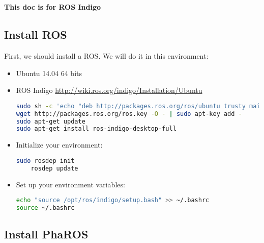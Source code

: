 \documentclass[a4paper,10pt,twoside]{book}
\begin{document}
\fi
\sloppy
\chapter{\installationTool{}}
\label{appendix:pharos}

\textbf{This doc is for ROS Indigo}

\section{Install ROS}

First, we should install a ROS. 
We will do it in this environment:

\begin{itemize}
	\item Ubuntu 14.04 64 bits
	\item ROS Indigo \url{http://wiki.ros.org/indigo/Installation/Ubuntu}

\begin{lstlisting}[language=bash]
sudo sh -c 'echo "deb http://packages.ros.org/ros/ubuntu trusty main" > /etc/apt/sources.list.d/ros-latest.list'
wget http://packages.ros.org/ros.key -O - | sudo apt-key add -
sudo apt-get update
sudo apt-get install ros-indigo-desktop-full
\end{lstlisting}
	

	
	\item Initialize your environment:

\begin{lstlisting}[language=bash]	
	sudo rosdep init
	rosdep update
\end{lstlisting}
	
	\item Set up your environment variables:
\begin{lstlisting}[language=bash]
echo "source /opt/ros/indigo/setup.bash" >> ~/.bashrc
source ~/.bashrc
\end{lstlisting}		
\end{itemize}

\section{Install PhaROS}
\end{document}
